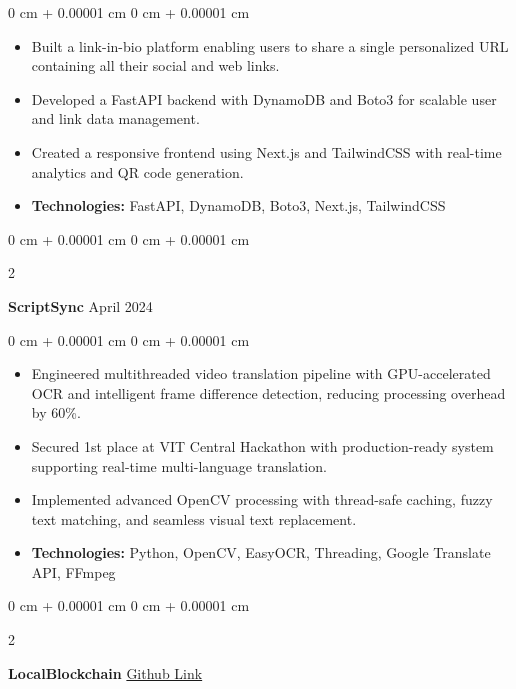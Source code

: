 \documentclass[10pt, letterpaper]{article}
\newenvironment{highlights}{
    \begin{itemize}[
        topsep=0.10 cm,
        parsep=0.10 cm,
        partopsep=0pt,
        itemsep=0pt,
        leftmargin=0 cm + 10pt
    ]
}{
    \end{itemize}
}
\newenvironment{onecolentry}{
    \begin{adjustwidth}{
        0 cm + 0.00001 cm
    }{
        0 cm + 0.00001 cm
    }
}{
    \end{adjustwidth}
}
\newenvironment{twocolentry}[2][]{
    \onecolentry
    \def\secondColumn{#2}
    \setcolumnwidth{\fill, 4.5 cm}
    \begin{paracol}{2}
}{
    \switchcolumn \raggedleft \secondColumn
    \end{paracol}
    \endonecolentry
}
\begin{document}
\vspace{0.10 cm}
\begin{onecolentry}
    \begin{highlights}
        \item Built a link-in-bio platform enabling users to share a single personalized URL containing all their social and web links.
        \item Developed a FastAPI backend with DynamoDB and Boto3 for scalable user and link data management.
        \item Created a responsive frontend using Next.js and TailwindCSS with real-time analytics and QR code generation.
        \item \textbf{Technologies:} FastAPI, DynamoDB, Boto3, Next.js, TailwindCSS
    \end{highlights}
\end{onecolentry}


        \vspace{0.2 cm}

\begin{twocolentry}{
            April 2024
        }
            \textbf{ScriptSync}\end{twocolentry}

        \vspace{0.10 cm}
        \begin{onecolentry}
            \begin{highlights}
                \item Engineered multithreaded video translation pipeline with GPU-accelerated OCR and intelligent frame difference detection, reducing processing overhead by 60\%.
                \item Secured 1st place at VIT Central Hackathon with production-ready system supporting real-time multi-language translation.
                \item Implemented advanced OpenCV processing with thread-safe caching, fuzzy text matching, and seamless visual text replacement.
                \item \textbf{Technologies:} Python, OpenCV, EasyOCR, Threading, Google Translate API, FFmpeg
            \end{highlights}
        \end{onecolentry}
    
        \vspace{0.2 cm}

        \begin{twocolentry}{
            \href{https://github.com/anshmehta7x/SimpleBlockchain}{Github Link}
        }
            \textbf{LocalBlockchain}\end{twocolentry}
\end{document}
